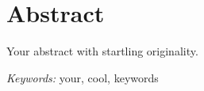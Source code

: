 \section*{\centering Abstract}
\begin{spacing}{2}
	\noindent
    Your abstract with startling originality. 
\end{spacing}

\smallskip

\begin{spacing}{2}
    \textit{Keywords: } your, cool, keywords
\end{spacing}